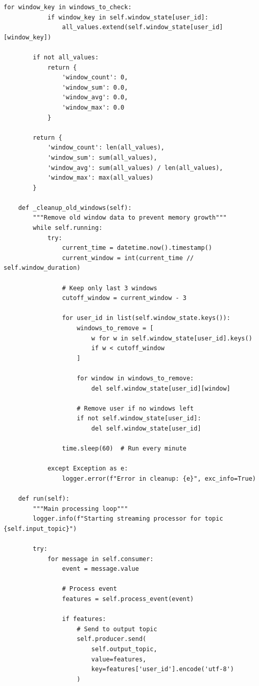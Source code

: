 \begin{lstlisting}[style=python, caption=Streaming Pipeline with Kafka]
        for window_key in windows_to_check:
            if window_key in self.window_state[user_id]:
                all_values.extend(self.window_state[user_id][window_key])

        if not all_values:
            return {
                'window_count': 0,
                'window_sum': 0.0,
                'window_avg': 0.0,
                'window_max': 0.0
            }

        return {
            'window_count': len(all_values),
            'window_sum': sum(all_values),
            'window_avg': sum(all_values) / len(all_values),
            'window_max': max(all_values)
        }

    def _cleanup_old_windows(self):
        """Remove old window data to prevent memory growth"""
        while self.running:
            try:
                current_time = datetime.now().timestamp()
                current_window = int(current_time // self.window_duration)

                # Keep only last 3 windows
                cutoff_window = current_window - 3

                for user_id in list(self.window_state.keys()):
                    windows_to_remove = [
                        w for w in self.window_state[user_id].keys()
                        if w < cutoff_window
                    ]

                    for window in windows_to_remove:
                        del self.window_state[user_id][window]

                    # Remove user if no windows left
                    if not self.window_state[user_id]:
                        del self.window_state[user_id]

                time.sleep(60)  # Run every minute

            except Exception as e:
                logger.error(f"Error in cleanup: {e}", exc_info=True)

    def run(self):
        """Main processing loop"""
        logger.info(f"Starting streaming processor for topic {self.input_topic}")

        try:
            for message in self.consumer:
                event = message.value

                # Process event
                features = self.process_event(event)

                if features:
                    # Send to output topic
                    self.producer.send(
                        self.output_topic,
                        value=features,
                        key=features['user_id'].encode('utf-8')
                    )


\end{lstlisting}
